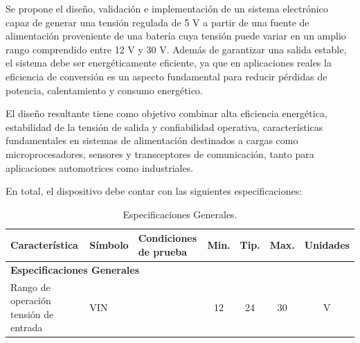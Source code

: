 \documentclass[]{article}
\begin{document}
	
	Se propone el diseño, validación e implementación de un sistema electrónico capaz de generar una tensión regulada de 5 V a partir de una fuente de alimentación proveniente de una batería cuya tensión puede variar en un amplio rango comprendido entre 12 V y 30 V. Además de garantizar una salida estable, el sistema debe ser energéticamente eficiente, ya que en aplicaciones reales la eficiencia de conversión es un aspecto fundamental para reducir pérdidas de potencia, calentamiento y consumo energético.
	
	
	El diseño resultante tiene como objetivo combinar alta eficiencia energética, estabilidad de la tensión de salida y confiabilidad operativa, características fundamentales en sistemas de alimentación destinados a cargas como
	microprocesadores, sensores y transceptores de comunicación, tanto para aplicaciones automotrices como industriales.
	
	En total, el dispositivo debe contar con las siguientes especificaciones:
	
	\begin{table}[h]
		\centering
		\renewcommand{\arraystretch}{1.5}
		\begin{tabular}{|p{3cm}|l|l|c|c|c|c|}
			\hline
			\textbf{Característica} & \textbf{Símbolo} & \textbf{Condiciones de prueba} & \textbf{Min.} & \textbf{Tip.} & \textbf{Max.} & \textbf{Unidades} \\
			\hline
			
			\multicolumn{7}{|l|}{\textbf{Especificaciones Generales}} \\
			\hline
			
			Rango de operación tensión de entrada & VIN &  & 12 & 24 & 30 & V \\
			\hline
			
			
			
			
		\end{tabular}
		\caption{Especificaciones Generales.}
	\end{table}
	
\end{document}
